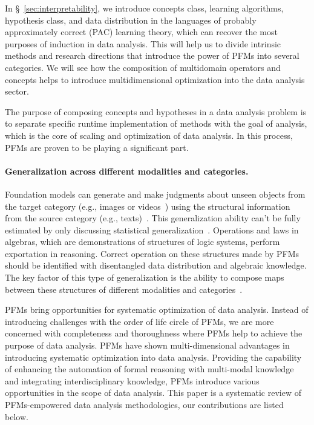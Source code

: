   In \S~\ref{sec:interpretability}, we introduce concepts class, learning algorithms, hypothesis class, and data distribution in the languages of probably approximately correct (PAC) learning theory, which can recover the most purposes of induction in data analysis. This will help us to divide intrinsic methods and research directions that introduce the power of PFMs into several categories. We will see how the composition of multidomain operators and concepts helps to introduce multidimensional optimization into the data analysis sector.
  
  The purpose of composing concepts and hypotheses in a data analysis problem is to separate specific runtime implementation of methods with the goal of analysis, which is the core of scaling and optimization of data analysis. In this process, PFMs are proven to be playing a significant part. 
  
  \paragraph{Generalization across different modalities and categories.} Foundation models can generate and make judgments about unseen objects from the target category (e.g., images or videos~\cite{queryvideo}) using the structural information from the source category (e.g., texts)~\cite{Yuan23a}. This generalization ability can't be fully estimated by only discussing statistical generalization~\cite{ReizingerUMKBH24}. Operations and laws in algebras, which are demonstrations of structures of logic systems, perform exportation in reasoning. Correct operation on these structures made by PFMs should be identified with disentangled data distribution and algebraic knowledge. The key factor of this type of generalization is the ability to compose maps between these structures of different modalities and categories~\cite{DuK24}. 
  
  
  PFMs bring opportunities for systematic optimization of data analysis. Instead of introducing challenges with the order of life circle of PFMs, we are more concerned with completeness and thoroughness where PFMs help to achieve the purpose of data analysis. PFMs have shown multi-dimensional advantages in introducing systematic optimization into data analysis. Providing the capability of enhancing the automation of formal reasoning with multi-modal knowledge and integrating interdisciplinary knowledge, PFMs introduce various opportunities in the scope of data analysis. This paper is a systematic review of PFMs-empowered data analysis methodologies, our contributions are listed below.
  

